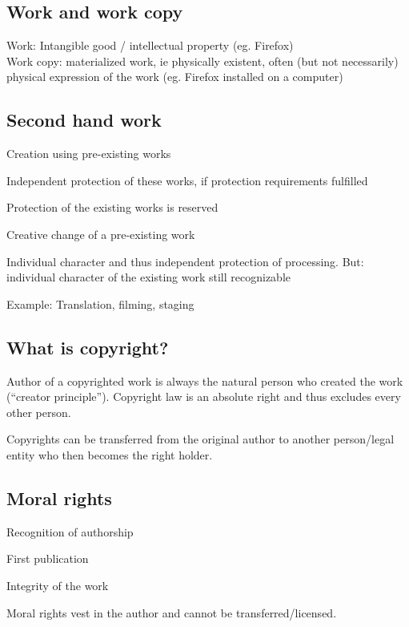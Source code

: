 \subsection{Work and work copy}
Work: Intangible good / intellectual property (eg. Firefox)\\
Work copy: materialized work, ie physically existent, often (but not necessarily) physical expression of the work (eg. Firefox installed on a computer)

\subsection{Second hand work}
\begin{compactitem}
	\item Creation using pre-existing works
	\item Independent protection of these works, if protection requirements fulfilled
	\item Protection of the existing works is reserved
	\item Creative change of a pre-existing work
	\item Individual character and thus independent protection of processing. But: individual character of the existing work still recognizable
	\item Example: Translation, filming, staging
\end{compactitem}

\subsection{What is copyright?}
\begin{compactitem}
	\item Author of a copyrighted work is always the natural person who created the work (“creator principle”). Copyright law is an absolute right and thus excludes every other person.
	\item Copyrights can be transferred from the original author to another person/legal entity who then becomes the right holder.
\end{compactitem}

\subsection{Moral rights}
\begin{compactitem}
	\item Recognition of authorship
	\item First publication
	\item Integrity of the work
\end{compactitem}
Moral rights vest in the author and cannot be transferred/licensed.

